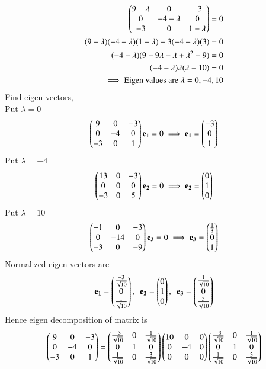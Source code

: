 \documentclass[journal,12pt,twocolumn]{IEEEtran}
\begin{document}
\begin{align}
	\begin{pmatrix}9-\lambda & 0 & -3\\0 & -4-\lambda & 0\\-3 & 0 & 1-\lambda\end{pmatrix} = 0\\
	(9-\lambda)(-4-\lambda)(1-\lambda) - 3(-4-\lambda)(3) = 0\\	
	(-4-\lambda)(9 - 9\lambda- \lambda + \lambda^2 - 9) = 0\\
	(-4-\lambda)\lambda(\lambda-10) = 0\\
	\implies\text{Eigen values are } \lambda = 0,-4,10
\end{align}
Find eigen vectors,\\
Put $\lambda = 0$
\begin{align}
	\begin{pmatrix}9 & 0 & -3\\0 & -4 & 0\\-3 & 0 & 1\end{pmatrix}\mathbf{e_1} = 0 \implies \mathbf{e_1}=\begin{pmatrix}-3\\0\\1\end{pmatrix}
\end{align}
Put $\lambda = -4$
\begin{align}
	\begin{pmatrix}13 & 0 & -3\\0 & 0 & 0\\-3 & 0 & 5\end{pmatrix}\mathbf{e_2} = 0 \implies \mathbf{e_2}=\begin{pmatrix}0\\1\\0\end{pmatrix}
\end{align}
Put $\lambda = 10$
\begin{align}
	\begin{pmatrix}-1 & 0 & -3\\0 & -14 & 0\\-3 & 0 & -9\end{pmatrix}\mathbf{e_3} = 0 \implies \mathbf{e_3} = \begin{pmatrix}\frac{1}{3}\\0\\1\end{pmatrix}
\end{align}
Normalized eigen vectors are
\begin{align}
	\mathbf{e_1}=\begin{pmatrix} \frac{-3}{\sqrt{10}} \\ 0 \\ \frac{1}{\sqrt{10}}\end{pmatrix}, \enspace \mathbf{e_2}=\begin{pmatrix}0\\1\\0\end{pmatrix}, \enspace \mathbf{e_3} = \begin{pmatrix}\frac{1}{\sqrt{10}} \\ 0\\ \frac{3}{\sqrt{10}}\end{pmatrix}
\end{align}
Hence eigen decomposition of matrix is
{\footnotesize	
\begin{align}\label{eq24}
	\begin{pmatrix}9 & 0 & -3\\0 & -4 & 0\\-3 & 0 & 1\end{pmatrix} = \begin{pmatrix}\frac{-3}{\sqrt{10}} & 0 & \frac{1}{\sqrt{10}}\\ 0 & 1 & 0\\ \frac{1}{\sqrt{10}} & 0 & \frac{3}{\sqrt{10}}\end{pmatrix} \begin{pmatrix}10 & 0 & 0\\0 & -4 & 0\\0 & 0 &0\end{pmatrix}\begin{pmatrix}\frac{-3}{\sqrt{10}} & 0 & \frac{1}{\sqrt{10}}\\ 0 & 1 & 0\\ \frac{1}{\sqrt{10}} & 0 & \frac{3}{\sqrt{10}}\end{pmatrix}
\end{align}}
\end{document}
